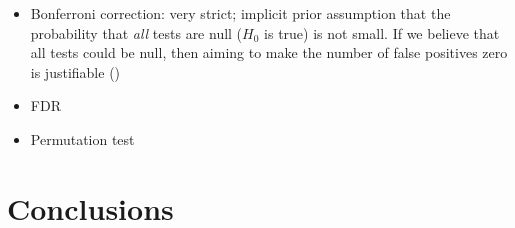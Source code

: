 \documentclass{bmcart}
\begin{document}
\begin{itemize}
\item Bonferroni correction: very strict; implicit prior assumption that the
probability that \emph{all} tests are null ($H_0$ is true) is not small. If we believe
that all tests could be null, then aiming to make the number of false
positives zero is justifiable (\cite{wakefield2008reporting})
\item FDR
\item Permutation test
\end{itemize}

\section*{Conclusions}

\end{document}
